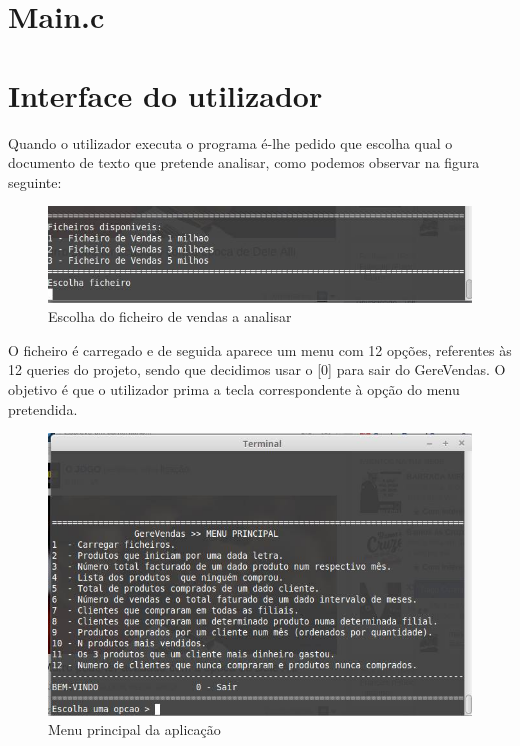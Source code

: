 \chapter{Main.c}




\chapter{Interface do utilizador}
Quando o utilizador executa o programa é-lhe pedido que escolha qual o documento de texto que pretende analisar, como podemos observar na figura seguinte: 

\begin{figure}[h!]
	\centering
	\includegraphics[scale=0.4]{1querie.png}  
	\caption{Escolha do ficheiro de vendas a analisar}  
\end{figure}

O ficheiro é carregado e de seguida aparece um menu com 12 opções, referentes às 12 queries do projeto, sendo que decidimos usar o [0] para sair do GereVendas. O objetivo é que o utilizador prima a tecla correspondente à opção do menu pretendida.

\begin{figure}[h!]
	\centering
	\includegraphics[scale=0.6]{menu.png}  
	\caption{Menu principal da aplicação}  
\end{figure}



